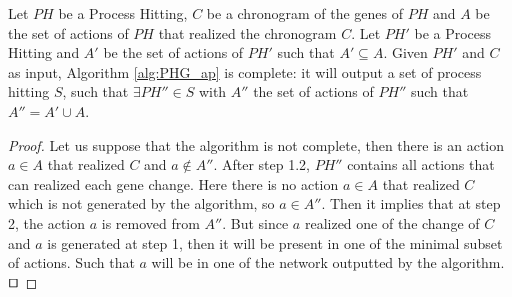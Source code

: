 %

\begin{theorem}[Completeness]%
	\label{th:correct}
	Let $PH$ be a Process Hitting, $C$ be a chronogram of the genes of $PH$ and $A$ be the set of actions of $PH$ that realized the chronogram $C$.
	Let $PH'$ be a Process Hitting and $A'$ be the set of actions of $PH'$ such that $A' \subseteq A$.
	Given $PH'$ and $C$ as input, Algorithm \ref{alg:PHG_ap} is complete:
	it will output a set of process hitting $S$,
	such that $\exists PH'' \in S$ with $A''$ the set of actions of $PH''$ such that $A'' = A' \cup A$.
	\begin{proof}
	Let us suppose that the algorithm is not complete, then there is an action $a \in A$ that realized $C$ and $a \not \in A''$.
	After step 1.2, $PH''$ contains all actions that can realized each gene change.
	Here there is no action $a \in A$ that realized $C$ which is not generated by the algorithm, so $a \in A''$.
	Then it implies that at step 2, the action $a$ is removed from $A''$.
	But since $a$ realized one of the change of $C$ and $a$ is generated at step 1, then it will be present in one of the minimal subset of actions.
	Such that $a$ will be in one of the network outputted by the algorithm.
	$\qed$
	\end{proof}
\end{theorem}



